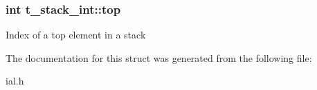 \subsubsection[{\texorpdfstring{top}{top}}]{\setlength{\rightskip}{0pt plus 5cm}int t\+\_\+stack\+\_\+int\+::top}\hypertarget{structt__stack__int_abedfedc1347b081f09c7d7ce85e12ab4}{}\label{structt__stack__int_abedfedc1347b081f09c7d7ce85e12ab4}
Index of a top element in a stack 

The documentation for this struct was generated from the following file\+:\begin{DoxyCompactItemize}
\item 
ial.\+h\end{DoxyCompactItemize}
